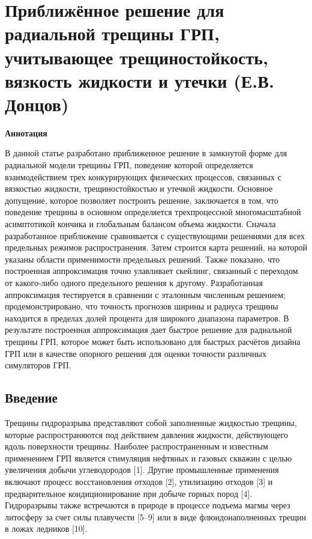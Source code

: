 \documentclass[main.tex]{subfiles}
\begin{document}

\section*{Приближённое решение для радиальной трещины ГРП, учитывающее трещиностойкость, вязкость жидкости и утечки (Е.В. Донцов)}

\textbf{Аннотация}

В данной статье разработано приближенное решение в замкнутой форме для радиальной модели трещины ГРП, поведение которой определяется взаимодействием трех конкурирующих физических процессов, связанных с вязкостью жидкости, трещиностойкостью и утечкой жидкости.
Основное допущение, которое позволяет построить решение, заключается в том, что поведение трещины в основном определяется трехпроцессной многомасштабной асимптотикой кончика и глобальным балансом объема жидкости.
Сначала разработанное приближение сравнивается с существующими решениями для всех предельных режимов распространения.
Затем строится карта решений, на которой указаны области применимости предельных решений.
Также показано, что построенная аппроксимация точно улавливает скейлинг, связанный с переходом от какого-либо одного предельного решения к другому.
Разработанная аппроксимация тестируется в сравнении с эталонным численным решением; продемонстрировано, что точность прогнозов ширины и радиуса трещины находится в пределах долей процента для широкого диапазона параметров.
В результате построенная аппроксимация дает быстрое решение для радиальной трещины ГРП, которое может быть использовано для быстрых расчётов дизайна ГРП или в качестве опорного решения для оценки точности различных симуляторов ГРП.

\subsection{Введение}

Трещины гидроразрыва представляют собой заполненные жидкостью трещины, которые распространяются под действием давления жидкости, действующего вдоль поверхности трещины.
Наиболее распространенным и известным применением ГРП является стимуляция нефтяных и газовых скважин с целью увеличения добычи углеводородов [1].
Другие промышленные применения включают процесс восстановления отходов [2], утилизацию отходов [3] и предварительное кондиционирование при добыче горных пород [4].
Гидроразрывы также встречаются в природе в процессе подъема магмы через литосферу за счет силы плавучести [5–9] или в виде флюидонаполненных трещин в ложах ледников [10].
\end{document}
